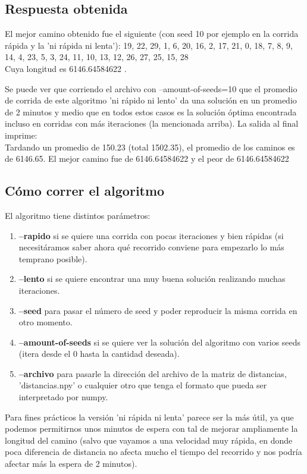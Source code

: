 \documentclass{article}
\begin{document}
\subsection{Respuesta obtenida}
El mejor camino obtenido fue el siguiente (con seed 10 por ejemplo en la corrida rápida y la 'ni rápida ni lenta'): 19, 22, 29, 1, 6, 20, 16, 2, 17, 21, 0, 18, 7, 8, 9, 14, 4, 23, 5, 3, 24, 11, 10, 13, 12, 26, 27, 25, 15, 28
\\
Cuya longitud es 6146.64584622 .

Se puede ver que corriendo el archivo con --amount-of-seeds=10 que el promedio de corrida de este algoritmo 'ni rápido ni lento' da una solución en un promedio de 2 minutos y medio que en todos estos casos es la solución óptima encontrada incluso en corridas con más iteraciones (la mencionada arriba). La salida al final imprime:\\
Tardando un promedio de 150.23 (total 1502.35), el promedio de los caminos es de 6146.65. El mejor camino fue de 6146.64584622 y el peor de 6146.64584622

\subsection{Cómo correr el algoritmo}

El algoritmo tiene distintos parámetros:

\begin{enumerate}
    \item \textbf{--rapido} si se quiere una corrida con pocas iteraciones y bien rápidas (si necesitáramos saber ahora qué recorrido conviene para empezarlo lo más temprano posible).
    \item \textbf{--lento} si se quiere encontrar una muy buena solución realizando muchas iteraciones.
    \item \textbf{--seed} para pasar el número de seed y poder reproducir la misma corrida en otro momento.
    \item \textbf{--amount-of-seeds} si se quiere ver la solución del algoritmo con varios seeds (itera desde el 0 hasta la cantidad deseada).
    \item \textbf{--archivo} para pasarle la dirección del archivo de la matriz de distancias, 'distancias.npy' o cualquier otro que tenga el formato que pueda ser interpretado por numpy.
\end{enumerate}

Para fines prácticos la versión 'ni rápida ni lenta' parece ser la más útil, ya que podemos permitirnos unos minutos de espera con tal de mejorar ampliamente la longitud del camino (salvo que vayamos a una velocidad muy rápida, en donde poca diferencia de distancia no afecta mucho el tiempo del recorrido y nos podría afectar más la espera de 2 minutos).
\end{document}
